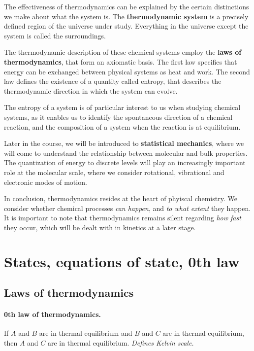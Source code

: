 \documentclass{article}
\numberwithin{theorem}{section}
\numberwithin{corollary}{section}
\numberwithin{postulate}{section}
\numberwithin{lemma}{section}
\numberwithin{definition}{section}
\begin{document}
The effectiveness of thermodynamics can be explained by the certain distinctions we
make about what the system is. The
\textbf{thermodynamic system} is a precisely defined region of the universe
under study. Everything in the universe except the system is called the
surroundings.

The thermodynamic description of these chemical systems employ the \textbf{laws
of thermodynamics}, that form an axiomatic basis. The first law specifies that
energy can be exchanged between physical systems as heat and work.
The second law defines the existence of a quantity called entropy, that
describes the thermodynamic direction in which the system can evolve.

The entropy of a system is of particular interest to us when studying chemical
systems, as it enables us to identify the spontaneous direction of a chemical
reaction, and the composition of a system when the reaction is at equilibrium.

Later in the course, we will be introduced to \textbf{statistical mechanics},
where we will come to understand the relationship between molecular and bulk
properties. The quantization of energy to discrete levels will play an
increasingly important role at the molecular scale, where we consider
rotational, vibrational and electronic modes of motion.

In conclusion, thermodynamics resides at the heart of phyiscal chemistry. We
consider whether chemical processes \textit{can happen}, and \textit{to what
extent} they happen. It is important to note that thermodynamics remains silent
regarding \textit{how fast} they occur, which will
be dealt with in kinetics at a later stage.

\setcounter{section}{0}
\section{States, equations of state, 0th law}

\subsection{Laws of thermodynamics}

\paragraph{0th law of thermodynamics.} If $A$ and $B$ are in thermal equilibrium
and $B$ and $C$ are in thermal equilibrium, then $A$ and $C$ are in thermal 
equilibrium. \textit{Defines Kelvin scale.}
\end{document}
